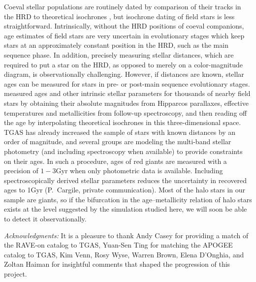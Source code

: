 \documentclass[apj, twocolappendix, numberedappendix, appendixfloats]{emulateapj}
\begin{document}
Coeval stellar populations are routinely dated by comparison of their tracks in the HRD to theoretical isochrones \citep[e.g.,][]{sandage1970, chaboyer1998, dotter2007}, but isochrone dating of field stars is less straightforward.
Intrinsically, without the HRD positions of coeval companions, age estimates of field stars are very uncertain in evolutionary stages which keep stars at an approximately constant position in the HRD, such as the main sequence phase.
In addition, precisely measuring stellar distances, which are required to put a star on the HRD, as opposed to merely on a color-magnitude diagram, is observationally challenging.
However, if distances are known, stellar ages can be measured for stars in pre- or post-main sequence evolutionary stages.
\citet{gcs} measured ages and other intrinsic stellar parameters for thousands of nearby field stars by obtaining their absolute magnitudes from Hipparcos parallaxes, effective temperatures and metallicities from follow-up spectroscopy, and then reading off the age by interpolating theoretical isochrones in this three-dimensional space.
TGAS has already increased the sample of stars with known distances by an order of magnitude, and several groups are modeling the multi-band stellar photometry (and including spectroscopy when available) to provide constraints on their ages.
In such a procedure, ages of red giants are measured with a precision of $1-3$\;Gyr when only photometric data is available.
Including spectroscopically derived stellar parameters reduces the uncertainty in recovered ages to 1\;Gyr (P.~Cargile, private communication).
Most of the halo stars in our sample are giants, so if the bifurcation in the age--metallicity relation of halo stars exists at the level suggested by the simulation studied here, we will soon be able to detect it observationally.



\vspace{0.5cm}
\emph{Acknowledgments:}
It is a pleasure to thank Andy Casey for providing a match of the RAVE-on catalog to TGAS, Yuan-Sen Ting for matching the APOGEE catalog to TGAS, Kim Venn, Rosy Wyse, Warren Brown, Elena D'Onghia, and Zoltan Haiman for insightful comments that shaped the progression of this project.

\end{document}

